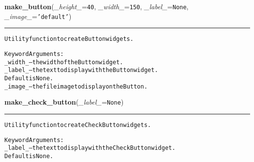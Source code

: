     \vspace{0.5ex}

\hspace{.8\funcindent}\begin{boxedminipage}{\funcwidth}

    \raggedright \textbf{make\_button}(\textit{\_height\_}={\tt 40}, \textit{\_width\_}={\tt 150}, \textit{\_label\_}={\tt None}, \textit{\_image\_}={\tt \texttt{'}\texttt{default}\texttt{'}})

    \vspace{-1.5ex}

    \rule{\textwidth}{0.5\fboxrule}
\setlength{\parskip}{2ex}
\begin{alltt}
Utility function to create Button widgets.

Keyword Arguments:
\_width\_ -- the width of the Button widget.
\_label\_ -- the text to display with the Button widget.
           Default is None.
\_image\_ -- the file image to display on the Button.
\end{alltt}

\setlength{\parskip}{1ex}
    \end{boxedminipage}

    \label{reliafree:widgets:make_check_button}

    \vspace{0.5ex}

\hspace{.8\funcindent}\begin{boxedminipage}{\funcwidth}

    \raggedright \textbf{make\_check\_button}(\textit{\_label\_}={\tt None})

    \vspace{-1.5ex}

    \rule{\textwidth}{0.5\fboxrule}
\setlength{\parskip}{2ex}
\begin{alltt}
Utility function to create CheckButton widgets.

Keyword Arguments:
\_label\_ -- the text to display with the CheckButton widget.
           Default is None.
\end{alltt}

\setlength{\parskip}{1ex}
    \end{boxedminipage}

    \label{reliafree:widgets:make_combo}

